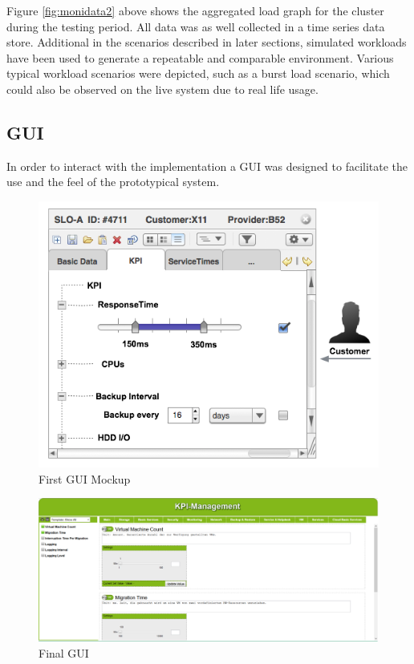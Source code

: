 Figure \ref{fig:monidata2} above shows the aggregated load graph for the cluster during the testing period. All data was as well collected in a time series data store. Additional in the scenarios described in later sections, simulated workloads have been used to generate a repeatable and comparable environment. Various typical workload scenarios were depicted, such as a burst load scenario, which could also be observed on the live system due to real life usage.


\subsection{GUI}
In order to interact with the implementation a GUI was designed to facilitate the use and the feel of the prototypical system.

\begin{figure}[ht]
	\centering
	\includegraphics[width=0.7\linewidth]{chapters/chapter5/fig/GUI}
	\caption{First GUI Mockup}
	\label{fig:gui}
\end{figure}


\begin{figure}[ht]
	\centering
	\includegraphics[width=0.7\linewidth]{chapters/chapter5/fig/Gui1}
	\caption{Final GUI}
	\label{fig:gui1}
\end{figure}


